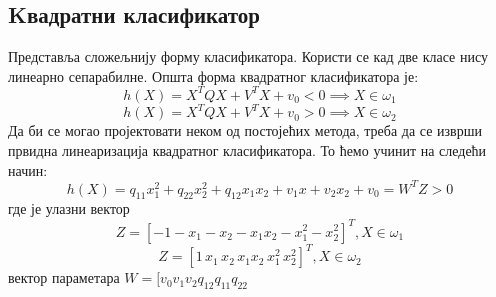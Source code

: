 \subsection{Kвадратни класификатор}

Представља сложељнију форму класификатора. Користи се кад две класе нису линеарно сепарабилне. Општа форма квадратног класификатора је:
$$h(X) = X^TQX + V^TX + v_0 < 0 \implies X\in \omega_1$$
$$h(X) = X^TQX + V^TX + v_0 > 0 \implies X\in \omega_2$$
Да би се могао пројектовати неком од постојећих метода, треба да се изврши првидна линеаризација квадратног класификатора. То ћемо учинит на следећи начин:
$$h(X) = q_{11} x_1^2 + q_{22}x_2^2 + q_{12}x_1x_2  + v_1x + v_2x_2 + v_0 = W^TZ > 0 $$
где је улазни вектор 
$$Z=[-1 -x_1 -x_2 -x_1x_2 -x_1^2 -x_2^2]^T, X\in \omega_1$$
$$Z=[1 \, x_1 \, x_2\,  x_1x_2\,  x_1^2\,  x_2^2]^T, X\in \omega_2$$
вектор параметара $W = [v_0 v_1 v_2 q_{12} q_{11} q_{22}$

